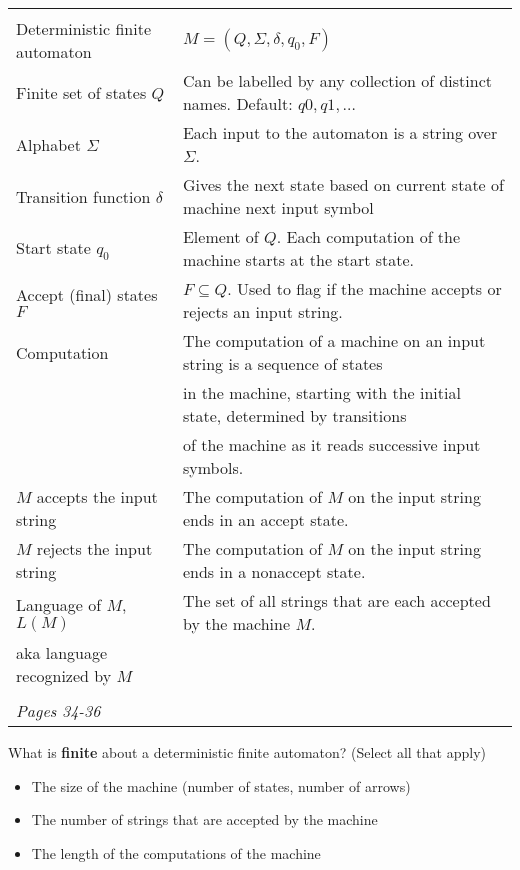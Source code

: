     \begin{center}
    \begin{tabular}{|ll|}
    \hline
    & \\
    Deterministic finite automaton & $M = (Q, \Sigma, \delta, q_0, F)$ \\
    Finite set of states $Q$  & Can  be labelled by any collection  of distinct names. Default: $q0, q1, \ldots$  \\
    Alphabet $\Sigma$ &   Each input to the automaton is a string over  $\Sigma$. \\
    Transition function $\delta$ &  Gives the next state based on current state of machine next input symbol\\
    Start state $q_0$ & Element of $Q$.  Each computation of the machine starts at the  start  state.\\
    Accept (final) states $F$ & $F \subseteq  Q$. Used to flag if the machine accepts or rejects
    an input string.\\
    Computation & The computation of a machine on an input string is a sequence of states \\
    &  in the machine,  starting with the initial state, determined by transitions \\
    & of the machine as it reads successive input symbols.
    \\
    $M$ accepts the input string & The computation of $M$ on the input string ends in an
    accept state.\\
    $M$ rejects the input string & The computation of $M$ on the input string ends in a
    nonaccept state.\\
    Language of $M$, $L(M)$ & The set of  all strings that  are each accepted by the machine $M$.\\
    aka language recognized by $M$ & \\
    & \\
    \hline
    {\it Pages 34-36}& \\
    \hline
    \end{tabular}
    \end{center}
    
    
    What is {\bf finite} about a deterministic finite automaton? (Select all that apply)
    \begin{itemize}
    \item The size of the machine (number of states, number of arrows)
    \item The number of strings that are accepted by the machine
    \item The length of the computations of the machine
    \end{itemize}
    
